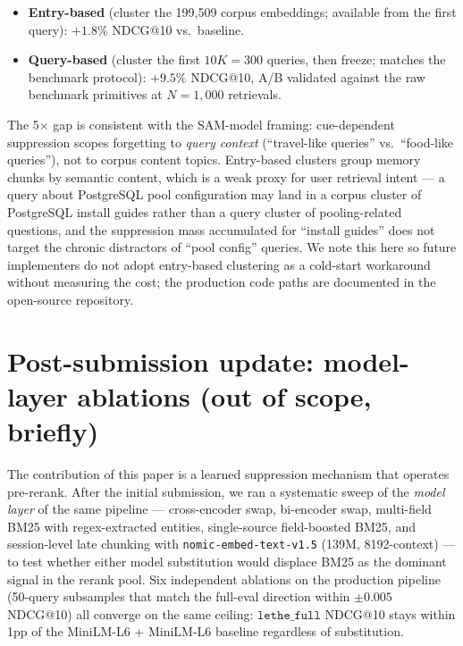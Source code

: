 \documentclass[11pt,a4paper]{article}
\begin{document}
\begin{itemize}
  \item \textbf{Entry-based} (cluster the 199{,}509 corpus embeddings; available from the first query): $+1.8\%$ NDCG@10 vs.\ baseline.
  \item \textbf{Query-based} (cluster the first $10K = 300$ queries, then freeze; matches the benchmark protocol): $+9.5\%$ NDCG@10, A/B validated against the raw benchmark primitives at $N=1{,}000$ retrievals.
\end{itemize}

The 5$\times$ gap is consistent with the SAM-model framing: cue-dependent suppression scopes forgetting to \emph{query context} (``travel-like queries'' vs.\ ``food-like queries''), not to corpus content topics. Entry-based clusters group memory chunks by semantic content, which is a weak proxy for user retrieval intent — a query about PostgreSQL pool configuration may land in a corpus cluster of PostgreSQL install guides rather than a query cluster of pooling-related questions, and the suppression mass accumulated for ``install guides'' does not target the chronic distractors of ``pool config'' queries. We note this here so future implementers do not adopt entry-based clustering as a cold-start workaround without measuring the cost; the production code paths are documented in the open-source repository.

\section*{Post-submission update: model-layer ablations (out of scope, briefly)}
\label{sec:post-update-bm25-dominance}

The contribution of this paper is a learned suppression mechanism that operates pre-rerank. After the initial submission, we ran a systematic sweep of the \emph{model layer} of the same pipeline — cross-encoder swap, bi-encoder swap, multi-field BM25 with regex-extracted entities, single-source field-boosted BM25, and session-level late chunking with \texttt{nomic-embed-text-v1.5} (139M, 8192-context) — to test whether either model substitution would displace BM25 as the dominant signal in the rerank pool. Six independent ablations on the production pipeline (50-query subsamples that match the full-eval direction within $\pm 0.005$ NDCG@10) all converge on the same ceiling: $\texttt{lethe\_full}$ NDCG@10 stays within 1pp of the MiniLM-L6 + MiniLM-L6 baseline regardless of substitution.
\end{document}
